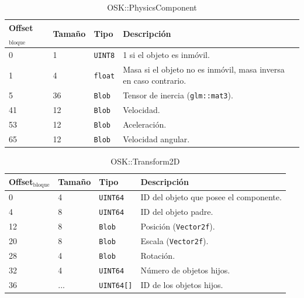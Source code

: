 \documentclass[12pt,a4paper]{article}
\begin{document}
\begin{table}[h]
\caption{OSK::PhysicsComponent}
\center
\begin{tabular}{llll}
\hline
Offset$_\text{bloque}$ & Tamaño & Tipo & Descripción \\ \hline
0 & 1 & \texttt{UINT8} & 1 si el objeto es inmóvil. \\
1 & 4 & \texttt{float} & Masa si el objeto no es inmóvil, masa inversa en caso contrario. \\
5 & 36 & \texttt{Blob} & Tensor de inercia (\texttt{glm::mat3}). \\
41 & 12 & \texttt{Blob} & Velocidad. \\
53 & 12 & \texttt{Blob} & Aceleración. \\
65 & 12 & \texttt{Blob} & Velocidad angular. \\
\hline
\end{tabular}
\end{table}

\begin{table}[h]
\caption{OSK::Transform2D}
\center
\begin{tabular}{llll}
\hline
Offset$_\text{bloque}$ & Tamaño & Tipo & Descripción \\ \hline
0 & 4 & \texttt{UINT64} & ID del objeto que posee el componente. \\
4 & 8 & \texttt{UINT64} & ID del objeto padre. \\
12 & 8 & \texttt{Blob} & Posición (\texttt{Vector2f}). \\
20 & 8 & \texttt{Blob} & Escala (\texttt{Vector2f}). \\
28 & 4 & \texttt{Blob} & Rotación. \\
32 & 4 & \texttt{UINT64} & Número de objetos hijos. \\
36 & ... & \texttt{UINT64[]} & ID de los objetos hijos. \\
\hline
\end{tabular}
\end{table}
\end{document}
